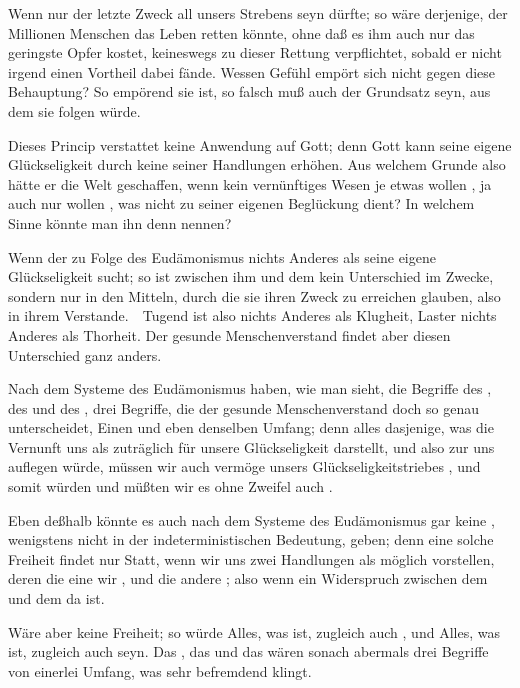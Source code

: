 \begin{aufzb}
\item Wenn nur  der letzte Zweck all unsers Strebens seyn dürfte; so wäre derjenige, der Millionen Menschen das Leben retten könnte, ohne daß es ihm auch nur das geringste Opfer kostet, keineswegs zu dieser Rettung verpflichtet, sobald er nicht irgend einen  Vortheil dabei fände. Wessen Gefühl empört sich nicht gegen diese Behauptung? So empörend sie ist, so falsch muß auch der Grundsatz seyn, aus dem sie folgen würde.
\item Dieses Princip verstattet keine Anwendung auf Gott; denn Gott kann seine eigene Glückseligkeit durch keine seiner Handlungen erhöhen. Aus welchem Grunde also hätte er die Welt geschaffen, wenn kein vernünftiges Wesen je etwas wollen , ja auch nur wollen , was nicht zu seiner eigenen Beglückung dient? In welchem Sinne könnte man ihn denn  nennen?
\item Wenn der  zu Folge des Eudämonismus nichts Anderes als seine eigene Glückseligkeit sucht; so ist zwischen ihm und dem  kein Unterschied im Zwecke, sondern nur in den Mitteln, durch die sie ihren Zweck zu erreichen glauben, also in ihrem Verstande.~\ Tugend ist also nichts Anderes als Klugheit, Laster nichts Anderes als Thorheit. Der gesunde Menschenverstand findet aber diesen Unterschied ganz anders.
\item Nach dem Systeme des Eudämonismus haben, wie man sieht, die Begriffe des , des  und des , drei Begriffe, die der gesunde Menschenverstand doch so genau unterscheidet, Einen und eben denselben Umfang; denn alles dasjenige, was die Vernunft uns als zuträglich für unsere Glückseligkeit darstellt, und also zur  uns auflegen würde, müssen wir auch vermöge unsers Glückseligkeitstriebes , und somit würden und müßten wir es ohne Zweifel auch .
\item Eben deßhalb könnte es auch nach dem Systeme des Eudämonismus gar keine , wenigstens nicht in der indeterministischen Bedeutung, geben; denn eine solche Freiheit findet nur Statt, wenn wir uns zwei Handlungen als möglich vorstellen, deren die eine wir , und die andere ; also wenn ein Widerspruch zwischen dem  und dem  da ist.
\item Wäre aber keine Freiheit; so würde Alles, was  ist, zugleich auch , und Alles, was  ist, zugleich auch  seyn. Das , das  und das  wären sonach abermals drei Begriffe von einerlei Umfang, was sehr befremdend klingt.

\end{aufzb}
